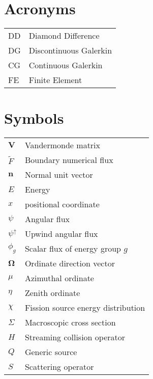 
\section*{Acronyms}
\begin{tabular}{l l}
DD & Diamond Difference \\
DG & Discontinuous Galerkin \\
CG & Continuous Galerkin \\
FE & Finite Element
\end{tabular}

\section*{Symbols}
\begin{tabular}{l l}
$\mathbf V$ & Vandermonde matrix \\
$\tilde F$ & Boundary numerical flux \\
$\mathbf n$ & Normal unit vector \\
$E$ & Energy \\
$x$ & positional coordinate \\
$\psi$ & Angular flux \\
$\psi^{\uparrow}$ & Upwind angular flux \\
$\phi_g$ & Scalar flux of energy group $g$ \\
$\mathbf \Omega$ & Ordinate direction vector \\
$\mu$ & Azimuthal ordinate \\
$\eta$ & Zenith ordinate \\
$\chi$  & Fission source energy distribution \\
$\Sigma$ & Macroscopic cross section \\
$H$ & Streaming collision operator \\
$Q$ & Generic source \\
$S$ & Scattering operator \\
\end{tabular}

\pagebreak
